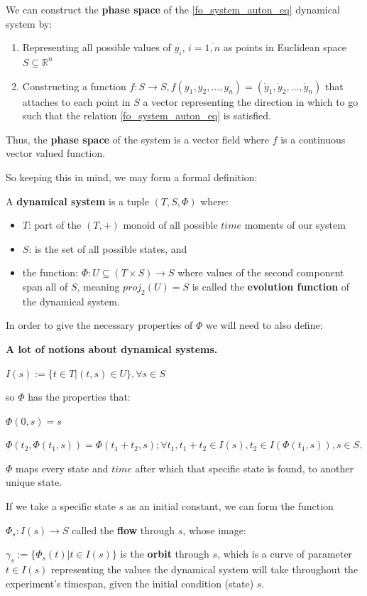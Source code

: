 \begin{definition}
	We can construct the \textbf{phase space} of the \ref{fo_system_auton_eq} dynamical system by:

	\begin{enumerate}
		\item Representing all possible values of $y_i$, $ i = \overline{1,n}$ as points in Euclidean space $S \subseteq \mathbb{R}^n$

		\item Constructing a function $f : S \rightarrow S, f(y_1,y_2,\dots,y_n) = (\dot{y}_1,\dot{y}_2,\dots,\dot{y}_n)$ that attaches to each point in $S$ a vector representing the direction in which to go such that the relation \ref{fo_system_auton_eq} is satisfied.
	\end{enumerate}
\end{definition}

Thus, the \textbf{phase space} of the system is a vector field where $f$ is a continuous vector valued function.

So keeping this in mind, we may form a formal definition:

\begin{definition}
	A \textbf{dynamical system} is a tuple $(T,S,\Phi)$ where:

	\begin{itemize}
		\item $T$: part of the $(T,+)$ monoid of all possible $time$ moments of our system
		\item $S$: is the set of all possible states, and
		\item the function: $\Phi : U \subseteq (T \times S ) \rightarrow S$ where values of the second component span all of $S$, meaning $proj_2(U) = S$ is called the \textbf{evolution function} of the dynamical system.
	\end{itemize}
	In order to give the necessary properties of $\Phi$ we will need to also define:
	\begin{definition}\label{dyn_sys_orbit_flow_etc_def}
		\textbf{A lot of notions about dynamical systems.} \cite{hale1996}

		$I(s):= \{ t \in T | (t,s) \in U \}, \forall s \in S$

		so $\Phi$ has the properties that:

		$\Phi(0,s) = s$

		$\Phi(t_2,\Phi(t_1,s)) = \Phi(t_1+t_2,s); \forall t_1, t_1+t_2 \in I(s), t_2 \in I(\Phi(t_1,s)), s \in S$.

		$\Phi$ maps every state and $time$ after which that specific state is found, to another unique state.
	\end{definition}

	If we take a specific state $s$ as an initial constant, we can form the function

	$\Phi_s : I(s) \rightarrow S$
	called the \textbf{flow} through $s$, whose image:

	$\gamma_s:=\{\Phi_s(t) | t\in I(s) \}$
	is the \textbf{orbit} through $s$,
	which is a curve of parameter $t \in I(s)$ representing the values the dynamical system will take throughout the experiment's timespan, given the initial condition (state) $s$.
\end{definition}

